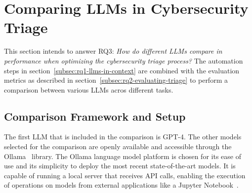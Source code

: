 \section{Comparing LLMs in Cybersecurity Triage}
\label{sec:rq3}

This section intends to answer RQ3:
\textit{How do different LLMs compare in performance when optimizing the cybersecurity triage process?}
The automation steps in section\ \ref{subsec:rq1-llms-in-context} are combined with the evaluation metrics as described
in section\ \ref{subsec:rq2-evaluating-triage} to perform a comparison between various LLMs acros different tasks.

\subsection{Comparison Framework and Setup}
\label{subsec:rq3-comparison-framework}

The first LLM that is included in the comparison is GPT-4.
The other models selected for the comparison are openly available and accessible through the
Ollama\ \citep{ollama} library.
The Ollama language model platform is chosen for its ease of use and its simplicity to deploy the most recent
state-of-the-art models.
It is capable of running a local server that receives API calls, enabling the execution of operations on models from
external applications like a Jupyter Notebook\ \citep{kluyver2016jupyter}.

